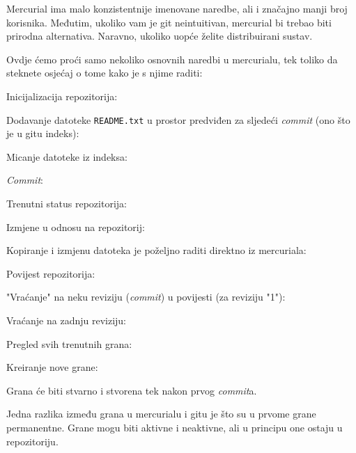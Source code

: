 Mercurial ima malo konzistentnije imenovane naredbe, ali i značajno manji broj korisnika.
Međutim, ukoliko vam je git neintuitivan, mercurial bi trebao biti prirodna alternativa. 
Naravno, ukoliko uopće želite distribuirani sustav.

Ovdje ćemo proći samo nekoliko osnovnih naredbi u mercurialu, tek toliko da steknete osjećaj o tome kako je s njime raditi:

Inicijalizacija repozitorija:


Dodavanje datoteke \verb+README.txt+ u prostor predviđen za sljedeći \emph{commit} (ono što je u gitu indeks):


Micanje datoteke iz indeksa:


\emph{Commit}:


Trenutni status repozitorija:


Izmjene u odnosu na repozitorij:


Kopiranje i izmjenu datoteka je poželjno raditi direktno iz mercuriala:


Povijest repozitorija:


"Vraćanje" na neku reviziju (\emph{commit}) u povijesti (za reviziju "1"):


Vraćanje na zadnju reviziju:


Pregled svih trenutnih grana:


Kreiranje nove grane:


Grana će biti stvarno i stvorena tek nakon prvog \emph{commit}a.

Jedna razlika između grana u mercurialu i gitu je što su u prvome grane permanentne.
Grane mogu biti aktivne i neaktivne, ali u principu one ostaju u repozitoriju.

